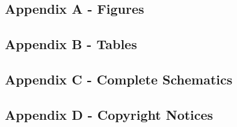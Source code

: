 \tbw

\subsection{Appendix A - Figures}

\subsection{Appendix B - Tables}

\subsection{Appendix C - Complete Schematics}

\subsection{Appendix D - Copyright Notices}

